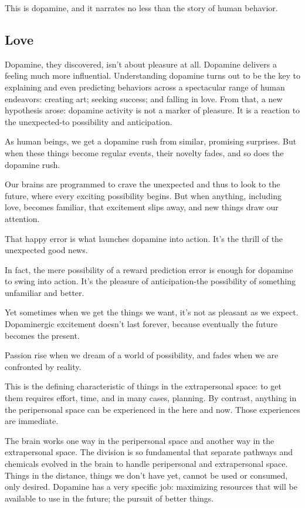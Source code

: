 \documentclass[ebook,12pt,oneside,openany]{memoir}
\begin{document}
This is dopamine, and it narrates no less than the story of human behavior.

\subsection{Love}
Dopamine, they discovered, isn't about pleasure at all. Dopamine delivers a feeling much more influential.
Understanding dopamine turns out to be the key to explaining and even predicting behaviors across a spectacular range of human endeavors:
creating art; seeking success; and falling in love.
From that, a new hypothesis arose: dopamine activity is not a marker of pleasure. 
It is a reaction to the unexpected-to possibility and anticipation.

As human beings, we get a dopamine rush from similar, promising surprises.
But when these things become regular events, their novelty fades, and so does the dopamine rush.

Our brains are programmed to crave the unexpected and thus to look to the future, where every exciting possibility begins.
But when anything, including love, becomes familiar, that excitement slips away, and new things draw our attention.

That happy error is what launches dopamine into action. It's the thrill of the unexpected good news.

In fact, the mere possibility of a reward prediction error is enough for dopamine to swing into action.
It's the pleasure of anticipation-the possibility of something unfamiliar and better.

Yet sometimes when we get the things we want, it's not as pleasant as we expect.
Dopaminergic excitement doesn't last forever, because eventually the future becomes the present.

Passion rise when we dream of a world of possibility, and fades when we are confronted by reality.

This is the defining characteristic of things in the extrapersonal space: to get them requires effort, time, and in many cases, planning.
By contrast, anything in the peripersonal space can be experienced in the here and now.
Those experiences are immediate. 

The brain works one way in the peripersonal space and another way in the extrapersonal space.
The division is so fundamental that separate pathways and chemicals evolved in the brain to handle peripersonal and extrapersonal space.
Things in the distance, things we don't have yet, cannot be used or consumed, only desired.
Dopamine has a very specific job: maximizing resources that will be available to use in the future; the pursuit of better things.
\end{document}
